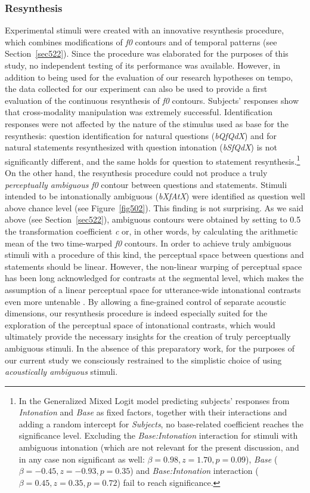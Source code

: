 \subsubsection{Resynthesis}\label{sec5411}
Experimental stimuli were created with an innovative resynthesis procedure, which combines modifications of \textit{f0} contours and of temporal patterns (see Section~\ref{sec522}). Since the procedure was elaborated for the purposes of this study, no independent testing of its performance was available. However, in addition to being used for the evaluation of our research hypotheses on tempo, the data collected for our experiment can also be used to provide a first evaluation of the continuous resynthesis of \textit{f0} contours.
Subjects' responses show that cross-modality manipulation was extremely successful. Identification responses were not affected by the nature of the stimulus used as base for the resynthesis: question identification for natural questions (\textit{bQfQdX}) and for natural statements resynthesized with question intonation (\textit{bSfQdX}) is not significantly different, and the same holds for question to statement resynthesis.\footnote{In the Generalized Mixed Logit model predicting subjects' responses from \textit{Intonation} and \textit{Base} as fixed factors, together with their interactions and adding a random intercept for \textit{Subjects}, no base-related coefficient reaches the significance level. Excluding the \textit{Base:Intonation} interaction for stimuli with ambiguous intonation (which are not relevant for the present discussion, and in any case non significant as well: $\beta=0.98, z=1.70, p=0.09$), \textit{Base} ($\beta=-0.45, z=-0.93, p=0.35$) and \textit{Base:Intonation} interaction ($\beta=0.45, z=0.35, p=0.72$) fail to reach significance.}
On the other hand, the resynthesis procedure could not produce a truly \textit{perceptually ambiguous} \textit{f0} contour between questions and statements. Stimuli intended to be intonationally ambiguous (\textit{bXfAtX}) were identified as question well above chance level (see Figure~\ref{fig502}). This finding is not surprising. As we said above (see Section~\ref{sec522}), ambiguous contours were obtained by setting to 0.5 the transformation coefficient \textit{c} or, in other words, by calculating the arithmetic mean of the two time-warped \textit{f0} contours. In order to achieve truly ambiguous stimuli with a procedure of this kind, the perceptual space between questions and statements should be linear. However, the non-linear warping of perceptual space has been long acknowledged for contrasts at the segmental level, which makes the assumption of a linear perceptual space for utterance-wide intonational contrasts even more untenable \citep{gubian2010automatic}. By allowing a fine-grained control of separate acoustic dimensions, our resynthesis procedure is indeed especially suited for the exploration of the perceptual space of intonational contrasts, which would ultimately provide the necessary insights for the creation of truly perceptually ambiguous stimuli. In the absence of this preparatory work, for the purposes of our current study we consciously restrained to the simplistic choice of using \textit{acoustically ambiguous} stimuli.
